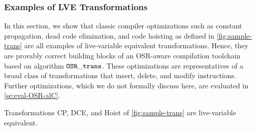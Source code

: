 \subsubsection{Examples of LVE Transformations}

\label{ss:lve-trans}

In this section, we show that classic compiler optimizations such as constant propagation, dead code elimination, and code hoisting as defined in \myfigure\ref{fig:sample-trans} are all examples of live-variable equivalent transformations. Hence, they are provably correct building blocks of an OSR-aware compilation toolchain based on algorithm $\text{${\tt OSR\_trans}$}$. These optimizations are representatives of a broad class of transformations that insert, delete, and modify instructions. Further optimizations, which we do not formally discuss here, are evaluated in \mysection\ref{se:eval-OSR-alC}.

\begin{theorem}
\label{th:lve-trans-examples}
Transformations CP, DCE, and Hoist of \myfigure\ref{fig:sample-trans} are live-variable equivalent.
\end{theorem}

